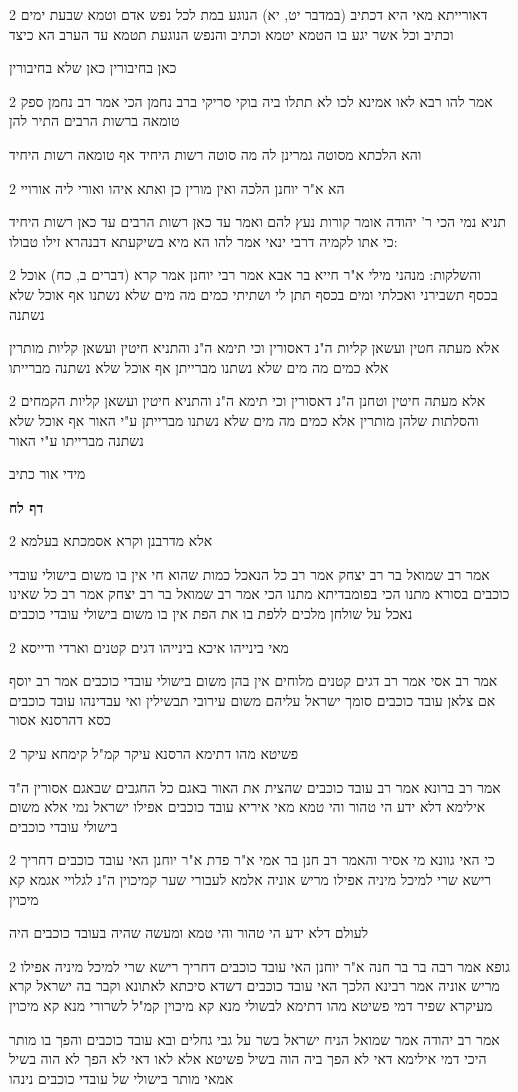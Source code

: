 \documentclass[12pt, openany]{book}
\newcommand{\sethebfont}{
\fontsize{10.5pt}{21.0pt} \selectfont
}
\newcommand{\twocol}[1]{
	{\sethebfont \begin{multicols}{2}
			#1
	\end{multicols}}	
}
\newcommand{\sectname}{}
\newcommand{\newsection}[1]{
	\addcontentsline{toc}{section}{#1}
	\renewcommand{\sectname}{#1}	
	\vspace{-\baselineskip}
	\begin{center}
		\textbf{%
\fontsize{16pt}{16pt}\selectfont
			#1}
	\end{center}
	\vspace{-\baselineskip}
	\nopagebreak
}
\begin{document}
\twocol{דאורייתא מאי היא דכתיב (במדבר יט, יא) הנוגע במת לכל נפש אדם וטמא שבעת ימים וכתיב וכל אשר יגע בו הטמא יטמא וכתיב והנפש הנוגעת תטמא עד הערב הא כיצד
\par כאן בחיבורין כאן שלא בחיבורין}
\twocol{אמר להו רבא לאו אמינא לכו לא תתלו ביה בוקי סריקי ברב נחמן הכי אמר רב נחמן ספק טומאה ברשות הרבים התיר להן
\par והא הלכתא מסוטה גמרינן לה מה סוטה רשות היחיד אף טומאה רשות היחיד}
\twocol{הא א"ר יוחנן הלכה ואין מורין כן ואתא איהו ואורי ליה אורויי
\par תניא נמי הכי ר' יהודה אומר קורות נעץ להם ואמר עד כאן רשות הרבים עד כאן רשות היחיד כי אתו לקמיה דרבי ינאי אמר להו הא מיא בשיקעתא דבנהרא זילו טבולו:}
\twocol{והשלקות: מנהני מילי א"ר חייא בר אבא אמר רבי יוחנן אמר קרא (דברים ב, כח) אוכל בכסף תשבירני ואכלתי ומים בכסף תתן לי ושתיתי כמים מה מים שלא נשתנו אף אוכל שלא נשתנה
\par אלא מעתה חטין ועשאן קליות ה"נ דאסורין וכי תימא ה"נ והתניא חיטין ועשאן קליות מותרין אלא כמים מה מים שלא נשתנו מברייתן אף אוכל שלא נשתנה מברייתו}
\twocol{אלא מעתה חיטין וטחנן ה"נ דאסורין וכי תימא ה"נ והתניא חיטין ועשאן קליות הקמחים והסלתות שלהן מותרין אלא כמים מה מים שלא נשתנו מברייתן ע"י האור אף אוכל שלא נשתנה מברייתו ע"י האור
\par מידי אור כתיב}
\newsection{דף לח}
\twocol{אלא מדרבנן וקרא אסמכתא בעלמא
\par אמר רב שמואל בר רב יצחק אמר רב כל הנאכל כמות שהוא חי אין בו משום בישולי עובדי כוכבים בסורא מתנו הכי בפומבדיתא מתנו הכי אמר רב שמואל בר רב יצחק אמר רב כל שאינו נאכל על שולחן מלכים ללפת בו את הפת אין בו משום בישולי עובדי כוכבים}
\twocol{מאי בינייהו איכא בינייהו דגים קטנים וארדי ודייסא
\par אמר רב אסי אמר רב דגים קטנים מלוחים אין בהן משום בישולי עובדי כוכבים אמר רב יוסף אם צלאן עובד כוכבים סומך ישראל עליהם משום עירובי תבשילין ואי עבדינהו עובד כוכבים כסא דהרסנא אסור}
\twocol{פשיטא מהו דתימא הרסנא עיקר קמ"ל קימחא עיקר
\par אמר רב ברונא אמר רב עובד כוכבים שהצית את האור באגם כל החגבים שבאגם אסורין ה"ד אילימא דלא ידע הי טהור והי טמא מאי איריא עובד כוכבים אפילו ישראל נמי אלא משום בישולי עובדי כוכבים}
\twocol{כי האי גוונא מי אסיר והאמר רב חנן בר אמי א"ר פדת א"ר יוחנן האי עובד כוכבים דחריך רישא שרי למיכל מיניה אפילו מריש אוניה אלמא לעבורי שער קמיכוין ה"נ לגלויי אגמא קא מיכוין
\par לעולם דלא ידע הי טהור והי טמא ומעשה שהיה בעובד כוכבים היה}
\twocol{גופא אמר רבה בר בר חנה א"ר יוחנן האי עובד כוכבים דחריך רישא שרי למיכל מיניה אפילו מריש אוניה אמר רבינא הלכך האי עובד כוכבים דשדא סיכתא לאתונא וקבר בה ישראל קרא מעיקרא שפיר דמי פשיטא מהו דתימא לבשולי מנא קא מיכוין קמ"ל לשרורי מנא קא מיכוין
\par אמר רב יהודה אמר שמואל הניח ישראל בשר על גבי גחלים ובא עובד כוכבים והפך בו מותר היכי דמי אילימא דאי לא הפך ביה הוה בשיל פשיטא אלא לאו דאי לא הפך לא הוה בשיל אמאי מותר בישולי של עובדי כוכבים נינהו}
\end{document}
